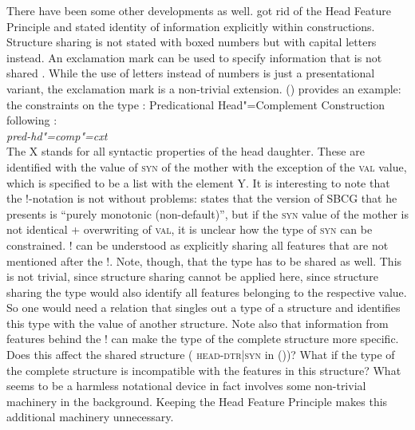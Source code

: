 \documentclass[output=paper
	        ,collection
	        ,collectionchapter
 	        ,biblatex
                ,babelshorthands
                ,newtxmath
                ,draftmode
                ,colorlinks, citecolor=brown
]{langscibook}
\begin{document}
There have been some other developments as well. \citet{Sag2012a} got rid of the Head Feature
Principle and stated identity of information explicitly within constructions. Structure sharing is
not stated with boxed numbers but with capital letters instead. An exclamation mark can be used to
specify information that is not shared \citep[]{Sag2012a}. While the use of letters instead
of numbers is just a presentational variant, the exclamation mark is a non-trivial
extension. () provides an example: the constraints on the type :
\eas
Predicational Head"=Complement Construction following \citet[]{Sag2012a}:\\
\emph{pred-hd"=comp"=cxt} \impl\\
\zs
The X stands for all syntactic properties of the head daughter. These are identified with the
value of \textsc{syn} of the mother with the exception of the \textsc{val} value, which is specified
to be a list with the element Y. It is interesting to note that the !-notation is not without
problems: \citet[]{Sag2012a} states that the version of SBCG that he presents is ``purely
monotonic (non-default)'', but if the \textsc{syn} value of the mother is not identical +
overwriting of \textsc{val}, it is unclear how the type of \textsc{syn} can be constrained. ! can be
understood as explicitly sharing all features that are not mentioned after the !. Note, though, that
the type has to be shared as well. This is not trivial, since structure sharing cannot be applied
here, since structure sharing the type would also identify all features belonging to the respective
value. So one would need a relation that singles out a type of a structure and identifies this type
with the value of another structure. Note also that information from features behind the ! can make
the type of the complete structure more specific. Does this affect the shared structure (\eg
\textsc{head-dtr|syn} in ())? What if the
type of the complete structure is incompatible with the features in this structure? What seems to be a harmless notational device in fact involves some
non-trivial machinery in the background. Keeping the Head Feature Principle makes this additional machinery
unnecessary. 
\end{document}
